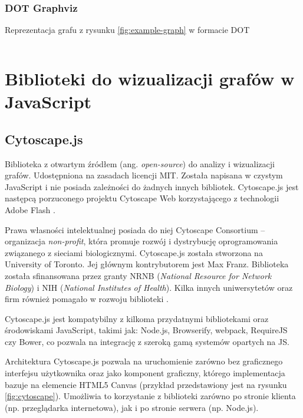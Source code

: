 \subsubsection{DOT Graphviz} 
\begin{listing}[H]
    \caption{Reprezentacja grafu z rysunku \ref{fig:example-graph} w formacie DOT}
    \inputminted{text}{example.gv}
    \label{lst:dot-example}
\end{listing}

\section{Biblioteki do wizualizacji grafów w JavaScript}

\subsection{Cytoscape.js}

Biblioteka z otwartym źródłem (ang. \textit{open-source}) do analizy i wizualizacji grafów. Udostępniona na zasadach licencji MIT. Została napisana w czystym JavaScript i nie posiada zależności do żadnych innych bibliotek. Cytoscape.js jest następcą porzuconego projektu Cytoscape Web korzystającego z technologii Adobe Flash \cite[309]{franz}. 

Prawa własności intelektualnej posiada do niej Cytoscape Consortium -- organizacja \textit{non-profit}, która promuje rozwój i dystrybucję oprogramowania związanego z sieciami biologicznymi. Cytoscape.js została stworzona na University of Toronto. Jej głównym kontrybutorem jest Max Franz. Biblioteka została sfinansowana przez granty NRNB (\textit{National Resource for Network Biology}) i NIH (\textit{National Institutes of Health}). Kilka innych uniwersytetów oraz firm również pomagało w rozwoju biblioteki \cite{cytoscape}. 

Cytoscape.js jest kompatybilny z kilkoma przydatnymi bibliotekami oraz środowiskami JavaScript, takimi jak: Node.js, Browserify, webpack, RequireJS czy Bower, co pozwala na integrację z szeroką gamą systemów opartych na JS. 

Architektura Cytoscape.js pozwala na uruchomienie zarówno bez graficznego interfejsu użytkownika oraz jako komponent graficzny, którego implementacja bazuje na elemencie HTML5 Canvas (przykład przedstawiony jest na rysunku \ref{fig:cytoscape}). Umożliwia to korzystanie z biblioteki zarówno po stronie klienta (np. przeglądarka internetowa), jak i po stronie serwera (np. Node.js).

